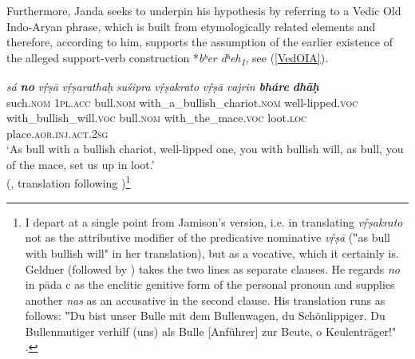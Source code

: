 \documentclass[output=paper,colorlinks,citecolor=brown]{langscibook}
\begin{document}
Furthermore, Janda seeks to underpin his hypothesis by referring to a Vedic Old Indo-Aryan phrase, which is built from etymologically related elements and therefore, according to him, supports the assumption of the earlier existence of the alleged support-verb construction *\textit{bʰer dʰeh\textsubscript{1}}, see (\ref{VedOIA}).

\ea \label{VedOIA}
\settowidth {}
\gll \textit{sá}	\textit{\textbf{no}}	\textit{vṛ́ṣā}    \textit{vṛ́ṣarathaḥ}		\textit{suśipra} \textit{vṛ́ṣakrato}		\textit{vṛ́ṣā}  \textit{vajrin}	\textit{\textbf{bháre}}  \textit{\textbf{dhāḥ}}\\
such.\textsc{nom}    \textsc{1pl.acc}   bull.\textsc{nom}   with\_a\_bullish\_chariot.\textsc{nom}  well-lipped.\textsc{voc}    with\_bullish\_will.\textsc{voc}    bull.\textsc{nom}    with\_the\_mace.\textsc{voc}    loot.\textsc{loc}    place.\textsc{aor.inj.act.2sg}\\ 
\glt ‘As bull with a bullish chariot, well-lipped one, you with bullish will, as bull, you of the mace, set us up in loot.’ \\
\hspace*{\fill}(, translation following \citealt[II: 703]{JamisonBrereton2014})\footnote{I depart at a single point from Jamison’s version, i.e. in translating \textit{vṛ́ṣakrato} not as the attributive modifier of the predicative nominative \textit{vṛ́ṣā} (‟as bull with bullish 
will" 
in her translation), but as a vocative, which it certainly is. Geldner (followed by \citealt[108]{Schutzeichel2014}) takes the two lines as separate clauses. He regards \textit{no} in pāda c as the enclitic genitive form of the personal pronoun and supplies another \textit{nas} as an accusative in the second clause. His translation runs as follows: ‟Du bist unser Bulle mit dem Bullenwagen, du Schönlippiger. Du Bullenmutiger verhilf (uns) als Bulle [Anführer] zur Beute, o Keulenträger!" \citep[II: 36]{Geldner1951}.}
\z
\end{document}
